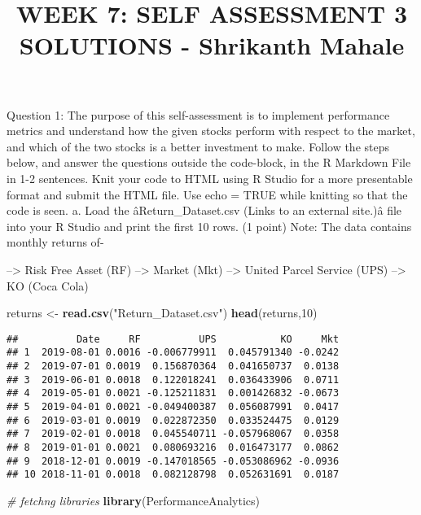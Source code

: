 \documentclass[]{article}
\title{WEEK 7: SELF ASSESSMENT 3 SOLUTIONS - Shrikanth Mahale}
\author{}
\date{}
\newenvironment{Shaded}{\begin{snugshade}}{\end{snugshade}}
\newcommand{\KeywordTok}[1]{\textcolor[rgb]{0.13,0.29,0.53}{\textbf{{#1}}}}
\newcommand{\DecValTok}[1]{\textcolor[rgb]{0.00,0.00,0.81}{{#1}}}
\newcommand{\StringTok}[1]{\textcolor[rgb]{0.31,0.60,0.02}{{#1}}}
\newcommand{\CommentTok}[1]{\textcolor[rgb]{0.56,0.35,0.01}{\textit{{#1}}}}
\newcommand{\NormalTok}[1]{{#1}}
\begin{document}
\maketitle

Question 1: The purpose of this self-assessment is to implement
performance metrics and understand how the given stocks perform with
respect to the market, and which of the two stocks is a better
investment to make. Follow the steps below, and answer the questions
outside the code-block, in the R Markdown File in 1-2 sentences. Knit
your code to HTML using R Studio for a more presentable format and
submit the HTML file. Use echo = TRUE while knitting so that the code is
seen. a. Load the âReturn\_Dataset.csv (Links to an external site.)â
file into your R Studio and print the first 10 rows. (1 point) Note: The
data contains monthly returns of-

--\textgreater{} Risk Free Asset (RF) --\textgreater{} Market (Mkt)
--\textgreater{} United Parcel Service (UPS) --\textgreater{} KO (Coca
Cola)

\begin{Shaded}
\begin{Highlighting}[]
\NormalTok{returns <-}\StringTok{ }\KeywordTok{read.csv}\NormalTok{(}\StringTok{"Return_Dataset.csv"}\NormalTok{)}
\KeywordTok{head}\NormalTok{(returns,}\DecValTok{10}\NormalTok{)}
\end{Highlighting}
\end{Shaded}

\begin{verbatim}
##          Date     RF          UPS           KO     Mkt
## 1  2019-08-01 0.0016 -0.006779911  0.045791340 -0.0242
## 2  2019-07-01 0.0019  0.156870364  0.041650737  0.0138
## 3  2019-06-01 0.0018  0.122018241  0.036433906  0.0711
## 4  2019-05-01 0.0021 -0.125211831  0.001426832 -0.0673
## 5  2019-04-01 0.0021 -0.049400387  0.056087991  0.0417
## 6  2019-03-01 0.0019  0.022872350  0.033524475  0.0129
## 7  2019-02-01 0.0018  0.045540711 -0.057968067  0.0358
## 8  2019-01-01 0.0021  0.080693216  0.016473177  0.0862
## 9  2018-12-01 0.0019 -0.147018565 -0.053086962 -0.0936
## 10 2018-11-01 0.0018  0.082128798  0.052631691  0.0187
\end{verbatim}

\begin{Shaded}
\begin{Highlighting}[]
\CommentTok{# fetchng libraries}
\KeywordTok{library}\NormalTok{(PerformanceAnalytics)}
\end{Highlighting}
\end{Shaded}
\end{document}

